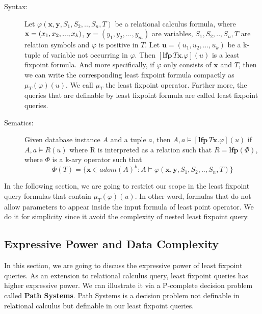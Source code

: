 \begin{description}

\item[Syntax:]
Let $\varphi(\textbf{x},\textbf{y}, S_1,S_2,..,S_n, T)$ be a relational calculus formula, where $\textbf{x}=(x_1, \\x_2,...,x_k)$, $\textbf{y}=(y_1,y_2,...,y_m)$ are variables, $S_1,S_2,..,S_n, T$ are relation symbols and $\varphi$ is positive in $T$. Let $\textbf{u}=(u_1, u_2,...,u_k)$ be a k-tuple of variable not occurring in $\varphi$. Then $[\textbf{lfp}\,T\textbf{x}.\varphi](u)$ is a least fixpoint formula. And more specifically, if $\varphi$ only consists of $\textbf{x}$ and $T$, then we can write the corresponding least fixpoint formula compactly as $\mu_T(\varphi)(u)$. We call $\mu_T$ the least fixpoint operator. Farther more, the queries that are definable by least fixpoint formula are called least fixpoint queries.\\

\item[Sematics:]
Given database instance $A$ and a tuple $a$, then $A, a \models [\textbf{lfp}\,T\textbf{x}.\varphi](u)$ if $A, a \models R(u)$ where R is interpreted as a relation such that $R=\textbf{lfp}(\Phi)$, where $\Phi$ is a k-ary operator such that
$$ \Phi(T) = \{\textbf{x}\in adom(A)^k: A\models \varphi(\textbf{x},\textbf{y},S_1,S_2,..,S_n,T)\}$$ 

\end{description}

In the following section, we are going to restrict our scope in the least fixpoint query formulas that contain $\mu_T(\varphi)(u)$. In other word, formulas that do not allow parameters to appear inside the input formula of least point operator. We do it for simplicity since it avoid the complexity of nested least fixpoint query.\\ 

\subsection{Expressive Power and Data Complexity}

In this section, we are going to discuss the expressive power of least fixpoint queries. As an extension to relational calculus query, least fixpoint queries has higher expressive power. We can illustrate it via a P-complete decision problem called \textbf{Path Systems}\cite{Cook}. Path Systems is a decision problem not definable in relational calculus but definable in our least fixpoint queries. \\

